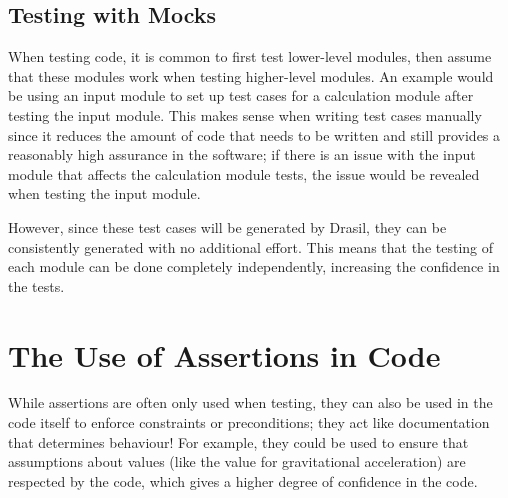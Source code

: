 \subsection{Testing with Mocks}

When testing code, it is common to first test lower-level modules, then assume
that these modules work when testing higher-level modules. An example would be
using an input module to set up test cases for a calculation module after
testing the input module. This makes sense when writing test cases manually
since it reduces the amount of code that needs to be written and still provides
a reasonably high assurance in the software; if there is an issue with the
input module that affects the calculation module tests, the issue would be
revealed when testing the input module.

However, since these test cases will be generated by Drasil, they can be
consistently generated with no additional effort. This means that the testing
of each module can be done completely independently, increasing the confidence
in the tests.

\section{The Use of Assertions in Code}
\label{chap:dev-proc:code-assertions}

While assertions are often only used when testing, they can also be used in
the code itself to enforce constraints or preconditions; they act like
documentation that determines behaviour! For example, they could be used to
ensure that assumptions about values (like the value for gravitational
acceleration) are respected by the code, which gives a higher degree of
confidence in the code.
